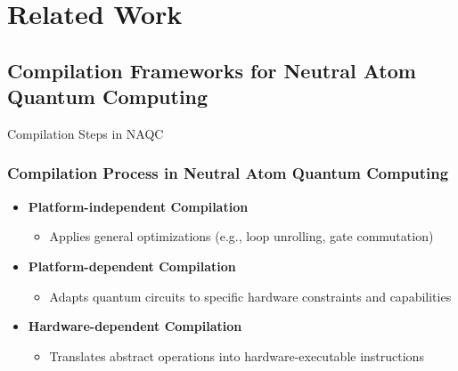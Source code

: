\section{Related Work}

\subsection{Compilation Frameworks for Neutral Atom Quantum Computing}

\begin{frame}{Compilation Steps in NAQC}
    \frametitle{Compilation Process in Neutral Atom Quantum Computing}
    \begin{itemize}
        \item \textbf{Platform-independent Compilation}
            \begin{itemize}
                \item Applies general optimizations (e.g., loop unrolling, gate commutation)
            \end{itemize}
        \item \textbf{Platform-dependent Compilation}
            \begin{itemize}
                \item Adapts quantum circuits to specific hardware constraints and capabilities
            \end{itemize}
        \item \textbf{Hardware-dependent Compilation}
            \begin{itemize}
                \item Translates abstract operations into hardware-executable instructions
            \end{itemize}
    \end{itemize}
\end{frame}

